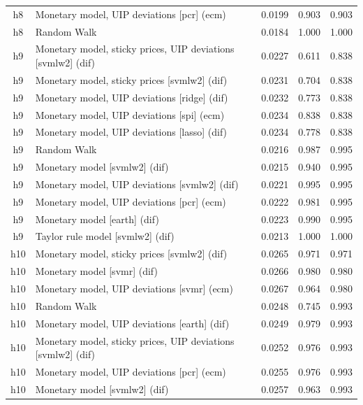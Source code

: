 \begin{ThreePartTable}
\begin{longtable}[t]{cp{5.5cm}ccc}
h8 & \raggedright Monetary model, UIP deviations [pcr] (ecm) & 0.0199 & 0.903 & 0.903\\
h8 & \raggedright Random Walk & 0.0184 & 1.000 & 1.000\\
\addlinespace
h9 & \raggedright Monetary model, sticky prices, UIP deviations [svmlw2] (dif) & 0.0227 & 0.611 & 0.838\\
h9 & \raggedright Monetary model, sticky prices [svmlw2] (dif) & 0.0231 & 0.704 & 0.838\\
h9 & \raggedright Monetary model, UIP deviations [ridge] (dif) & 0.0232 & 0.773 & 0.838\\
h9 & \raggedright Monetary model, UIP deviations [spi] (ecm) & 0.0234 & 0.838 & 0.838\\
h9 & \raggedright Monetary model, UIP deviations [lasso] (dif) & 0.0234 & 0.778 & 0.838\\
h9 & \raggedright Random Walk & 0.0216 & 0.987 & 0.995\\
h9 & \raggedright Monetary model [svmlw2] (dif) & 0.0215 & 0.940 & 0.995\\
h9 & \raggedright Monetary model, UIP deviations [svmlw2] (dif) & 0.0221 & 0.995 & 0.995\\
h9 & \raggedright Monetary model, UIP deviations [pcr] (ecm) & 0.0222 & 0.981 & 0.995\\
h9 & \raggedright Monetary model [earth] (dif) & 0.0223 & 0.990 & 0.995\\
h9 & \raggedright Taylor rule model [svmlw2] (dif) & 0.0213 & 1.000 & 1.000\\
\addlinespace
h10 & \raggedright Monetary model, sticky prices [svmlw2] (dif) & 0.0265 & 0.971 & 0.971\\
h10 & \raggedright Monetary model [svmr] (dif) & 0.0266 & 0.980 & 0.980\\
h10 & \raggedright Monetary model, UIP deviations [svmr] (ecm) & 0.0267 & 0.964 & 0.980\\
h10 & \raggedright Random Walk & 0.0248 & 0.745 & 0.993\\
h10 & \raggedright Monetary model, UIP deviations [earth] (dif) & 0.0249 & 0.979 & 0.993\\
h10 & \raggedright Monetary model, sticky prices, UIP deviations [svmlw2] (dif) & 0.0252 & 0.976 & 0.993\\
h10 & \raggedright Monetary model, UIP deviations [pcr] (ecm) & 0.0255 & 0.976 & 0.993\\
h10 & \raggedright Monetary model [svmlw2] (dif) & 0.0257 & 0.963 & 0.993\\

\end{longtable}
\end{ThreePartTable}
